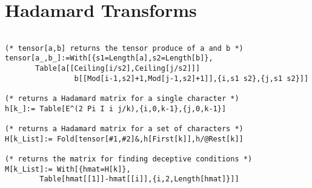 \section{Hadamard Transforms}
\begin{verbatim}

(* tensor[a,b] returns the tensor produce of a and b *)
tensor[a_,b_]:=With[{s1=Length[a],s2=Length[b]},
       Table[a[[Ceiling[i/s2],Ceiling[j/s2]]]
                b[[Mod[i-1,s2]+1,Mod[j-1,s2]+1]],{i,s1 s2},{j,s1 s2}]]

(* returns a Hadamard matrix for a single character *)
h[k_]:= Table[E^(2 Pi I i j/k),{i,0,k-1},{j,0,k-1}]

(* returns a Hadamard matrix for a set of characters *)
H[k_List]:= Fold[tensor[#1,#2]&,h[First[k]],h/@Rest[k]]

(* returns the matrix for finding deceptive conditions *)
M[k_List]:= With[{hmat=H[k]},
        Table[hmat[[1]]-hmat[[i]],{i,2,Length[hmat]}]]

\end{verbatim}
